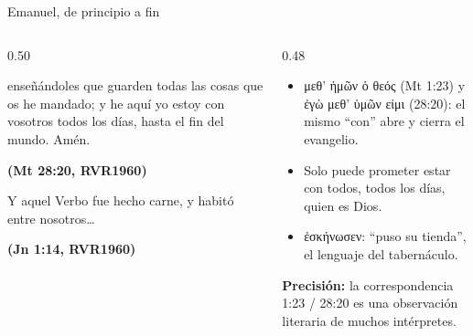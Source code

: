 \documentclass[hyperref={bookmarks=false},aspectratio=169]{beamer}
\newcommand{\grc}[1]{\foreignlanguage{ancientgreek}{#1}}
\newcommand{\fuente}[1]{\par\hfill{\upshape\bfseries\footnotesize\textcolor{azul}{#1}}}
\newcommand{\precision}[1]{{\footnotesize\color{gris}\textbf{Precisión:} #1}}
\begin{document}
\begin{frame}{Emanuel, de principio a fin}
\begin{columns}[t,onlytextwidth]
\begin{column}{0.50\textwidth}
\begin{cita}[fontupper=\scriptsize\itshape]enseñándoles que guarden todas las cosas que os he mandado; y he aquí yo estoy con vosotros todos los días, hasta el fin del mundo. Amén.\fuente{(Mt 28:20, RVR1960)}\end{cita}
\begin{cita}[fontupper=\scriptsize\itshape]Y aquel Verbo fue hecho carne, y habitó entre nosotros\ldots\fuente{(Jn 1:14, RVR1960)}\end{cita}
\end{column}
\begin{column}{0.48\textwidth}\small
\begin{itemize}
\item \grc{μεθ’ ἡμῶν ὁ θεός} (Mt 1:23) y \grc{ἐγὼ μεθ’ ὑμῶν εἰμι} (28:20): el mismo ``con'' abre y cierra el evangelio.
\item Solo puede prometer estar con todos, todos los días, quien es Dios.
\item \grc{ἐσκήνωσεν}: ``puso su tienda'', el lenguaje del tabernáculo.
\end{itemize}
\precision{la correspondencia 1:23 / 28:20 es una observación literaria de muchos intérpretes.}
\end{column}
\end{columns}
\end{frame}
\end{document}

